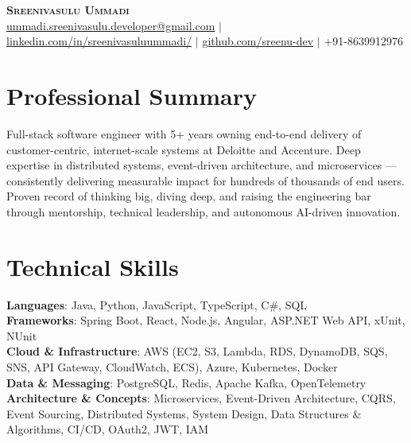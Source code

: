 \documentclass[letterpaper,11pt]{article}
\begin{document}
\begin{center}
    \textbf{\Huge \scshape Sreenivasulu Ummadi} \\ \vspace{5pt}
    \small \href{mailto:ummadi.sreenivasulu.developer@gmail.com}{ummadi.sreenivasulu.developer@gmail.com} $|$
    \href{https://www.linkedin.com/in/sreenivasuluummadi/}{linkedin.com/in/sreenivasuluummadi/} $|$
    \href{https://github.com/sreenu-dev}{github.com/sreenu-dev} $|$
    \small +91-8639912976
\end{center}

\section{Professional Summary}
\small{Full-stack software engineer with 5+ years owning end-to-end delivery of customer-centric, internet-scale systems at Deloitte and Accenture. Deep expertise in distributed systems, event-driven architecture, and microservices — consistently delivering measurable impact for hundreds of thousands of end users. Proven record of thinking big, diving deep, and raising the engineering bar through mentorship, technical leadership, and autonomous AI-driven innovation.}

\section{Technical Skills}
 \begin{itemize}[leftmargin=0.15in, label={}]
    \small{\item{
     \textbf{Languages}{: Java, Python, JavaScript, TypeScript, C\#, SQL} \\
     \textbf{Frameworks}{: Spring Boot, React, Node.js, Angular, ASP.NET Web API, xUnit, NUnit} \\
     \textbf{Cloud \& Infrastructure}{: AWS (EC2, S3, Lambda, RDS, DynamoDB, SQS, SNS, API Gateway, CloudWatch, ECS), Azure, Kubernetes, Docker} \\
     \textbf{Data \& Messaging}{: PostgreSQL, Redis, Apache Kafka, OpenTelemetry} \\
     \textbf{Architecture \& Concepts}{: Microservices, Event-Driven Architecture, CQRS, Event Sourcing, Distributed Systems, System Design, Data Structures \& Algorithms, CI/CD, OAuth2, JWT, IAM}
    }}
 \end{itemize}
\end{document}

